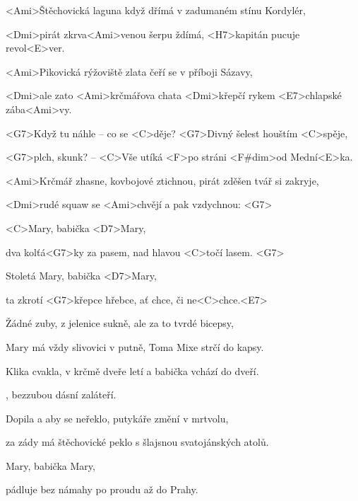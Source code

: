

\zs
<Ami>Štěchovická laguna když dřímá v zadumaném stínu Kordylér, 

<Dmi>pirát zkrva<Ami>venou šerpu ždímá, <H7>kapitán pucuje revol<E>ver. 

\bigskip

<Ami>Pikovická rýžoviště zlata čeří se v příboji Sázavy, 

<Dmi>ale zato <Ami>krčmářova chata <Dmi>křepčí rykem <E7>chlapské zába<Ami>vy. 

\bigskip

<G7>Když tu náhle -- co se <C>děje? <G7>Divný šelest houštím 
<C>spěje, 

<G7>plch, skunk? -- <C>Vše utíká <F>po stráni <F#dim>od 
Mední<E>ka. 

\bigskip

<Ami>Krčmář zhasne, kovbojové ztichnou, pirát zděšen tvář si zakryje, 

<Dmi>rudé squaw se <Ami>chvějí a pak vzdychnou:
<G7> \ks

\zr
<C>Mary, babička <D7>Mary, 

dva kolťá<G7>ky za pasem, nad hlavou <C>točí lasem. <G7>

Stoletá Mary, babička <D7>Mary, 

ta zkrotí <G7>křepce hřebce, ať chce, či ne<C>chce.<E7> 
\kr

\zs
Žádné zuby, z jelenice sukně, ale za to tvrdé bicepsy, 

Mary má vždy slivovici v putně, Toma Mixe strčí do kapsy. 

\bigskip

Klika cvakla, v krčmě dveře letí a babička vchází do dveří.

, bezzubou dásní zaláteří. 

\bigskip


\bigskip

Dopila a aby se neřeklo, putykáře změní v mrtvolu, 

za zády má štěchovické peklo s šlajsnou svatojánských atolů. 
\ks

\zr
Mary, babička Mary, 

pádluje bez námahy po proudu až do Prahy. 

